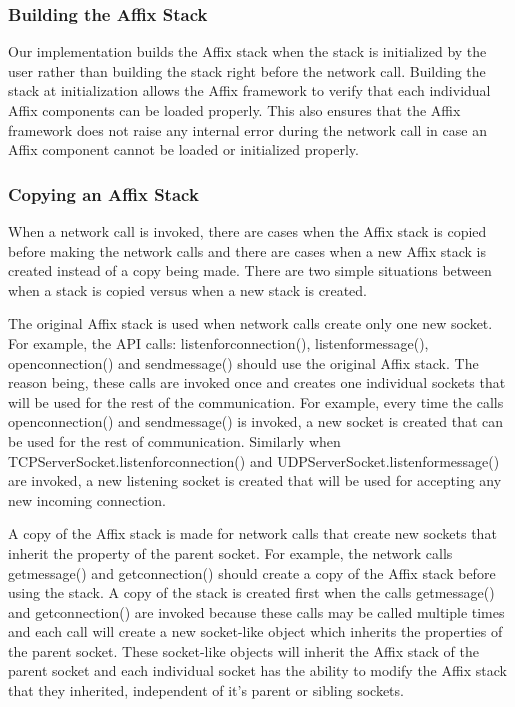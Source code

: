 \subsubsection{Building the Affix Stack}

Our implementation builds the Affix stack when the stack is 
initialized by the user rather than building the stack right before the network
call. Building the stack at initialization allows the Affix framework to verify
that each individual Affix components can be loaded properly. This also ensures
that the Affix framework does not raise any internal error during the network call
in case an Affix component cannot be loaded or initialized properly.

\subsubsection{Copying an Affix Stack}

When a network call is invoked, there are cases when the Affix stack is copied
before making the network calls and there are cases when a new Affix stack is
created instead of a copy being made. There are two simple situations between
when a stack is copied versus when a new stack is created. 

The original Affix stack is used when network calls create only one new socket. 
For example, the API calls: listenforconnection(), listenformessage(), openconnection() 
and sendmessage() should use the original Affix stack. The reason being, these calls 
are invoked once and creates one individual sockets that will be used for the rest 
of the communication. For example, every time the calls openconnection() and sendmessage() 
is invoked, a new socket is created that can be used for the rest of communication. 
Similarly when TCPServerSocket.listenforconnection() and UDPServerSocket.listenformessage() 
are invoked, a new listening
socket is created that will be used for accepting any new incoming connection.

A copy of the Affix stack is made for network calls that create new sockets that 
inherit the property of the parent socket. For example, the network calls getmessage() 
and getconnection() should create a copy of the Affix stack before using the stack. 
A copy of the stack is created first when the calls getmessage() and getconnection() 
are invoked because these calls  may be called multiple times and each call will create 
a new socket-like object which inherits the properties of the parent socket. These 
socket-like objects will inherit the Affix stack of the parent socket and each individual 
socket has the ability to modify the Affix stack that they inherited, independent of it's
parent or sibling sockets.

